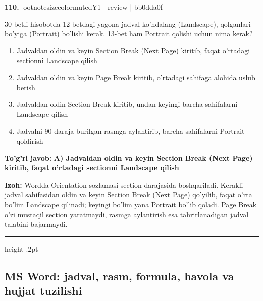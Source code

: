 \documentclass[10pt,a4paper]{article}
\begin{document}
\textbf{\color{ink}110.} {ootnotesizecolor{muted}Y1 | review | bb0dda0f}
\par
30 betli hisobotda 12-betdagi yagona jadval ko'ndalang (Landscape), qolganlari bo'yiga (Portrait) bo'lishi kerak. 13-bet ham Portrait qolishi uchun nima kerak?
\begin{enumerate}[label=\Alph*),leftmargin=9mm]
\item Jadvaldan oldin va keyin Section Break (Next Page) kiritib, faqat o'rtadagi sectionni Landscape qilish
\item Jadvaldan oldin va keyin Page Break kiritib, o'rtadagi sahifaga alohida uslub berish
\item Jadvaldan oldin Section Break kiritib, undan keyingi barcha sahifalarni Landscape qilish
\item Jadvalni 90 daraja burilgan rasmga aylantirib, barcha sahifalarni Portrait qoldirish
\end{enumerate}
\begin{tcolorbox}[enhanced,breakable,colback=teal!4,colframe=teal!55!black,boxrule=0.45pt,arc=1.2mm,left=2.8mm,right=2.8mm,top=2mm,bottom=2mm]
\textbf{\color{teal}To'g'ri javob:} \textbf{A) Jadvaldan oldin va keyin Section Break (Next Page) kiritib, faqat o'rtadagi sectionni Landscape qilish}
\par\smallskip
\textbf{Izoh:} Wordda Orientation sozlamasi section darajasida boshqariladi. Kerakli jadval sahifasidan oldin va keyin Section Break (Next Page) qo'yilib, faqat o'rta bo'lim Landscape qilinadi; keyingi bo'lim yana Portrait bo'lib qoladi. Page Break o'zi mustaqil section yaratmaydi, rasmga aylantirish esa tahrirlanadigan jadval talabini bajarmaydi.
\end{tcolorbox}
\vspace{2mm}\hrule height .2pt\vspace{2mm}
\subsection{MS Word: jadval, rasm, formula, havola va hujjat tuzilishi}
\end{document}
